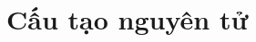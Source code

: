 \documentclass[Main_HOA10.tex]{subfiles}
\begin{document}
\chapter{Cấu tạo nguyên tử}



\end{document}
